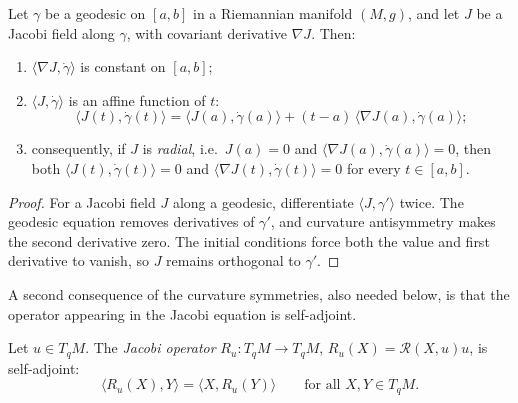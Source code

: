 \begin{lemma}
\label{lem:radial-jacobi-orthogonal}
\leanok



Let $\gamma$ be a geodesic on $[a,b]$ in a Riemannian manifold $(M,g)$,
and let $J$ be a Jacobi field along $\gamma$, with covariant derivative
$\nabla J$. Then:
\begin{enumerate}
\item $\langle\nabla J,\dot\gamma\rangle$ is constant on $[a,b]$;
\item $\langle J,\dot\gamma\rangle$ is an affine function of $t$:
$$\langle J(t),\dot\gamma(t)\rangle
=\langle J(a),\dot\gamma(a)\rangle
+(t-a)\,\langle\nabla J(a),\dot\gamma(a)\rangle;$$
\item consequently, if $J$ is {\sl radial}, i.e.\ $J(a)=0$ and
$\langle\nabla J(a),\dot\gamma(a)\rangle=0$, then both
$\langle J(t),\dot\gamma(t)\rangle=0$ and
$\langle\nabla J(t),\dot\gamma(t)\rangle=0$ for every $t\in[a,b]$.
\end{enumerate}
\end{lemma}

\begin{proof}
\sketch
{}
\leanok
For a Jacobi field $J$ along a geodesic, differentiate $\langle J,\gamma'\rangle$ twice. The geodesic equation removes derivatives of $\gamma'$, and curvature antisymmetry makes the second derivative zero. The initial conditions force both the value and first derivative to vanish, so $J$ remains orthogonal to $\gamma'$.
\end{proof}

A second consequence of the curvature symmetries, also needed below, is
that the operator appearing in the Jacobi equation is self-adjoint.

\begin{lemma}
\label{lem:jacobi-operator-symmetric}
\leanok



Let $u\in T_qM$. The {\sl Jacobi operator} $R_u\colon T_qM\to T_qM$,
$R_u(X)={\mathcal R}(X,u)u$, is self-adjoint:
$$\langle R_u(X),Y\rangle=\langle X,R_u(Y)\rangle
\qquad\text{for all }X,Y\in T_qM.$$
\end{lemma}

